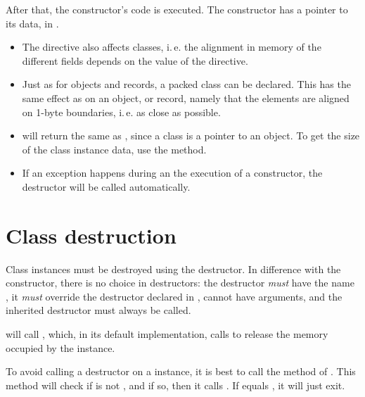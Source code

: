 After that, the constructor's code is executed.
The constructor has a pointer to its data, in .

\begin{remark}
\begin{itemize}
\item The  directive also affects classes,
i.\,e. the alignment in memory of the different fields depends on the
value of  the  directive.
\item Just as for objects and records, a packed class can be declared.
This has the same effect as on an object, or record, namely that the
elements are aligned on 1-byte boundaries, i.\,e. as close as possible.
\item {} will return the same as ,
since a class is a pointer to an object. To get the size of the class
instance data, use the  method.
\item If an exception happens during an the execution of a constructor,
the destructor will be called automatically.
\end{itemize}
\end{remark}



\section{Class destruction}
Class instances must be destroyed using the destructor. In difference with
the constructor, there is no choice in destructors: the destructor {\em must}
have the name , it {\em must}  override the  destructor
declared in , cannot have arguments, and the inherited destructor
must always be called.

 will call , which, in its default implementation,
calls  to release the memory occupied by the instance.

To avoid calling a destructor on a  instance, it is best to call
the  method of . This method will check if  is not ,
and if so, then it calls . If  equals , it
will just exit.

